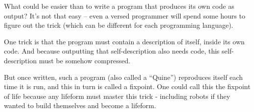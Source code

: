 
What could be easier than to write a program that produces its own code as output?
It's not that easy -- even a versed programmer will
spend some hours to figure out the trick (which can be different for each
programming language).

One trick is that the program must contain a description of itself,
inside its own code. And because outputting that self-description also
needs code, this self-description must be somehow compressed.

But once written, such a program (also called a ``Quine'') reproduces
itself each time it is run, and this in turn is called a fixpoint.
One could call this the fixpoint of life because any lifeform must
master this trick - including robots if they wanted to build themselves
and become a lifeform.

